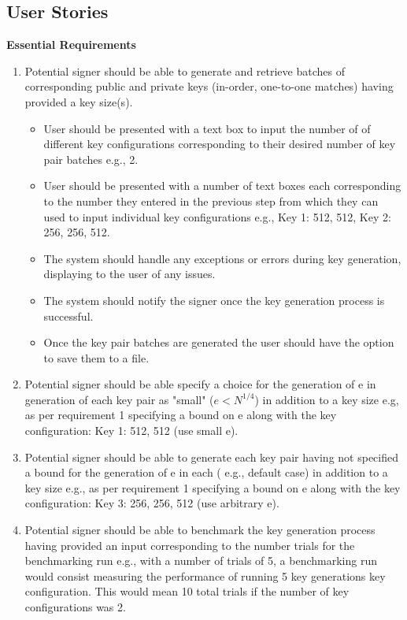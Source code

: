 \documentclass[]{final_report}
\theoremstyle{definition}
\begin{document}
\subsection{User Stories}
\textbf{Essential Requirements}
\begin{enumerate}
\item Potential signer should be able to generate and retrieve batches of corresponding public and private keys (in-order, one-to-one matches) having provided a key size(s).
\begin{itemize}
\item User should be presented with a text box to input the number of of different key configurations corresponding to their desired number of key pair batches e.g., 2.
\item User should be presented with a number of text boxes each corresponding to the number they entered in the previous step from which they can used to input individual key configurations e.g., Key 1: 512, 512, Key 2: 256, 256, 512.
\item The system should handle any exceptions or errors during key generation, displaying to the user of any issues.
\item The system should notify the signer once the key generation process is successful.
\item Once the key pair batches are generated the user should have the option to save them to a file.
\end{itemize}
\item Potential signer should be able specify a choice for the generation of e in generation of each key pair as "small" (\( e < N^{1/4} \)) in addition to a key size e.g, as per requirement 1 specifying a bound on e along with the key configuration: Key 1: 512, 512 (use small e).
\item Potential signer should be able to generate each key pair having not specified a bound for the generation of e in each ( e.g., default case) in addition to a key size e.g., as per requirement 1 specifying a bound on e along with the key configuration: Key 3: 256, 256, 512 (use arbitrary e).
\item Potential signer should be able to benchmark the key generation process having provided an input corresponding to the number trials for the benchmarking run e.g., with a number of trials of 5, a benchmarking run would consist measuring the performance of running 5 key generations key configuration. This would mean 10 total trials if the number of key configurations was 2.
\begin{itemize}

\end{itemize}
\end{enumerate}
\end{document}
